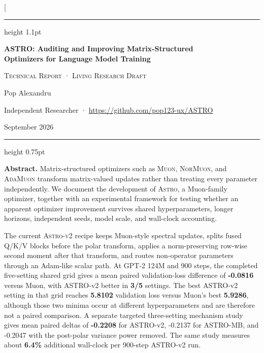 \documentclass[10pt,twocolumn]{article}
\newcommand{\ASTRO}{\textsc{Astro}\xspace}
\newcommand{\ASTROv}{\textsc{Astro-v2}\xspace}
\newcommand{\Muon}{\textsc{Muon}\xspace}
\newcommand{\NorMuon}{\textsc{NorMuon}\xspace}
\newcommand{\AdaMuon}{\textsc{AdaMuon}\xspace}
\newcommand{\good}[1]{\textcolor{astropurple}{\textbf{#1}}}
\begin{document}
\twocolumn[
\begin{@twocolumnfalse}
\hrule height 1.1pt
\vspace{0.70em}
\begin{center}
{\Large\bfseries ASTRO: Auditing and Improving Matrix-Structured\\
Optimizers for Language Model Training\par}
\vspace{0.48em}
{\small\scshape Technical Report · Living Research Draft\par}
\vspace{0.65em}
{\normalsize Pop Alexandru\par}
{\small Independent Researcher · \url{https://github.com/pop123-ux/ASTRO}\par}
{\small September 2026\par}
\end{center}
\vspace{0.42em}
\hrule height 0.75pt
\vspace{0.85em}

\begin{minipage}{0.94\textwidth}
\small
\textbf{Abstract.}
Matrix-structured optimizers such as \Muon, \NorMuon, and \AdaMuon transform
matrix-valued updates rather than treating every parameter independently. We
document the development of \ASTRO, a Muon-family optimizer, together with an
experimental framework for testing whether an apparent optimizer improvement
survives shared hyperparameters, longer horizons, independent seeds, model
scale, and wall-clock accounting.

The current \ASTROv recipe keeps Muon-style spectral updates, splits fused
Q/K/V blocks before the polar transform, applies a norm-preserving row-wise
second moment after that transform, and routes non-operator parameters through
an Adam-like scalar path. At GPT-2 124M and 900 steps, the completed five-setting
shared grid gives a mean paired validation-loss difference of
\good{-0.0816} versus Muon, with ASTRO-v2 better in \good{3/5} settings. The
best ASTRO-v2 setting in that grid reaches \good{5.8102} validation loss versus
Muon's best \good{5.9286}, although those two minima occur at different
hyperparameters and are therefore not a paired comparison. A separate targeted
three-setting mechanism study gives mean paired deltas of \good{-0.2208} for
ASTRO-v2, -0.2137 for ASTRO-MB, and -0.2047 with the post-polar variance power
removed. The same study measures about \textbf{6.4\%} additional wall-clock per
900-step ASTRO-v2 run.


\end{minipage}
\end{@twocolumnfalse}
\end{document}
